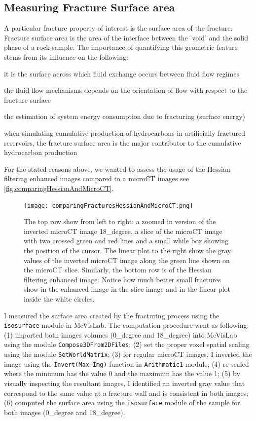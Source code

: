 \documentclass{edger}
\begin{document}
 
\subsection{Measuring Fracture Surface area} \label{sec:MeasuringFractureSurfaceArea}
A particular fracture property of interest is the surface area of the fracture. Fracture surface area is the area of the interface between the 'void' and the solid phase of a rock sample. The importance of quantifying this geometric feature stems from its influence on the following:
\begin{tight_itemize}
	\item it is the surface across which fluid exchange occurs between fluid flow regimes
	\item the fluid flow mechanisms depends on the orientation of flow with respect to the fracture surface
	\item the estimation of system energy consumption due to fracturing (surface energy) \citep{Zhao2020}
	\item when simulating cumulative production of hydrocarbons in artificially fractured reservoirs, the fracture surface area is the major contributor to the cumulative hydrocarbon production \citep{Orangi2011}
\end{tight_itemize}

For the stated reasons above, we wanted to assess the usage of the Hessian filtering enhanced images compared to a microCT images see \autoref{fig:comparingHessianAndMicroCT}. 

\begin{figure}[!ht]
\centering
\texttt{[image: comparingFracturesHessianAndMicroCT.png]}
\caption{The top row show from left to right: a zoomed in version of the inverted microCT image 18\_degree, a slice of the microCT image with two crossed green and red lines and a small while box showing the position of the cursor. The linear plot to the right show the gray values of the inverted microCT image along the green line shown on the microCT slice.  Similarly, the bottom row is of the Hessian filtering enhanced image. Notice how much better small fractures show in the enhanced image in the slice image and in the linear plot inside the white circles. }
\label{fig:comparingHessianAndMicroCT}
\end{figure}

I measured the surface area created by the fracturing process using the \texttt{isosurface} module in MeVisLab. The computation procedure went as following: (1) imported both images volumes (0\_degree and 18\_degree) into MeVisLab using the module \texttt{Compose3DFrom2DFiles}; (2) set the proper voxel spatial scaling using the module \texttt{SetWorldMatrix}; (3) for regular microCT images, I inverted the image using the \texttt{Invert(Max-Img)} function in \texttt{Arithmatic1} module; (4) re-scaled where the minimum has the value 0 and the maximum has the value 1; (5) by visually inspecting the resultant images, I identified an inverted gray value that correspond to the same value at a fracture wall and is consistent in both images; (6) computed the surface area using the \texttt{isosurface} module of the sample for both images (0\_degree and 18\_degree).
\end{document}
